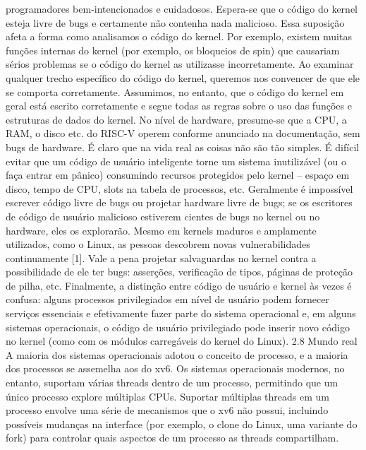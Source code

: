 programadores  bem-intencionados  e  cuidadosos.  Espera-se  que  o  código  do  kernel  esteja  livre  de  bugs  e  certamente  não  
contenha  nada  malicioso.  Essa  suposição  afeta  a  forma  como  analisamos  o  código  do  kernel.  Por  exemplo,  existem  muitas  
funções  internas  do  kernel  (por  exemplo,  os  bloqueios  de  spin)  que  causariam  sérios  problemas  se  o  código  do  kernel  as  
utilizasse  incorretamente.  Ao  examinar  qualquer  trecho  específico  do  código  do  kernel,  queremos  nos  convencer  de  que  ele  
se  comporta  corretamente.  Assumimos,  no  entanto,  que  o  código  do  kernel  em  geral  está  escrito  corretamente  e  segue  
todas  as  regras  sobre  o  uso  das  funções  e  estruturas  de  dados  do  kernel.  No  nível  de  hardware,  presume-se  que  a  CPU,  a  
RAM,  o  disco  etc.  do  RISC-V  operem  conforme  anunciado  na  documentação,  sem  bugs  de  hardware.
 É  claro  que  na  vida  real  as  coisas  não  são  tão  simples.  É  difícil  evitar  que  um  código  de  usuário  inteligente  torne  um  
sistema  inutilizável  (ou  o  faça  entrar  em  pânico)  consumindo  recursos  protegidos  pelo  kernel  –  espaço  em  disco,  tempo  de  
CPU,  slots  na  tabela  de  processos,  etc.  Geralmente  é  impossível  escrever  código  livre  de  bugs  ou  projetar  hardware  livre  de  
bugs;  se  os  escritores  de  código  de  usuário  malicioso  estiverem  cientes  de  bugs  no  kernel  ou  no  hardware,  eles  os  
explorarão.  Mesmo  em  kernels  maduros  e  amplamente  utilizados,  como  o  Linux,  as  pessoas  descobrem  novas  
vulnerabilidades  continuamente  [1].  Vale  a  pena  projetar  salvaguardas  no  kernel  contra  a  possibilidade  de  ele  ter  bugs:  
asserções,  verificação  de  tipos,  páginas  de  proteção  de  pilha,  etc.  Finalmente,  a  distinção  entre  código  de  usuário  e  kernel  
às  vezes  é  confusa:  alguns  processos  privilegiados  em  nível  de  usuário  podem  fornecer  serviços  essenciais  e  efetivamente  
fazer  parte  do  sistema  operacional  e,  em  alguns  sistemas  operacionais,  o  código  de  usuário  privilegiado  pode  inserir  novo  
código  no  kernel  (como  com  os  módulos  carregáveis  do  kernel  do  Linux).
 2.8  Mundo  real
 A  maioria  dos  sistemas  operacionais  adotou  o  conceito  de  processo,  e  a  maioria  dos  processos  se  assemelha  aos  do  xv6.  
Os  sistemas  operacionais  modernos,  no  entanto,  suportam  várias  threads  dentro  de  um  processo,  permitindo  que  um  único  
processo  explore  múltiplas  CPUs.  Suportar  múltiplas  threads  em  um  processo  envolve  uma  série  de  mecanismos  que  o  xv6  
não  possui,  incluindo  possíveis  mudanças  na  interface  (por  exemplo,  o  clone  do  Linux,  uma  variante  do  fork)  para  controlar  
quais  aspectos  de  um  processo  as  threads  compartilham.
